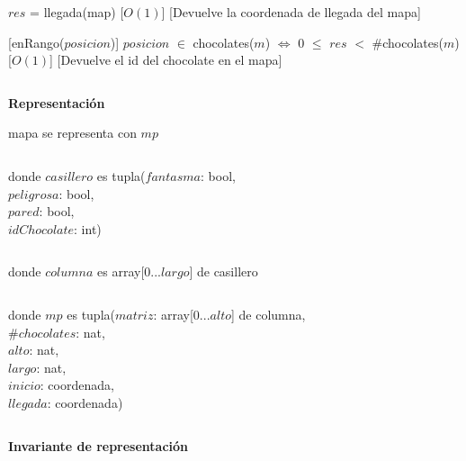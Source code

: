 \documentclass{book}
\begin{document}
\begin{Interfaz}
            {$res$ = llegada(map)}%
            [$O(1)$]
            [Devuelve la coordenada de llegada del mapa]

            \newpage

            [enRango($posicion$)]
            {$posicion$ $\in$ chocolates($m$) $\iff$ $0$ $\leq$ $res$ $<$ \#chocolates($m$)}%
            [$O(1)$]
            [Devuelve el id del chocolate en el mapa]

    \end{Interfaz}


    $ $

    \textbf{Representación}

    mapa se representa con $mp$

    $ $

    donde $casillero$ es tupla($fantasma$: bool, \\
        \text{}\qquad\quad $peligrosa$: bool, \\
        \text{}\qquad\quad $pared$: bool, \\
        \text{}\qquad\quad $idChocolate$: int)

    $ $

    donde $columna$ es array[0...$largo$] de casillero

    $ $

    donde $mp$ es tupla($matriz$: array[0...$alto$] de columna, \\
        \text{}\qquad\quad \#$chocolates$: nat, \\
        \text{}\qquad\quad $alto$: nat, \\
        \text{}\qquad\quad $largo$: nat, \\
        \text{}\qquad\quad $inicio$: coordenada, \\
        \text{}\qquad\quad $llegada$: coordenada)

    $ $

    \textbf{Invariante de representación}

\end{document}
